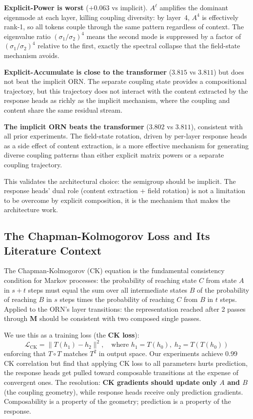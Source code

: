\documentclass[11pt, a4paper]{article}
\newcommand{\M}{\mathbf{M}}
\theoremstyle{plain}
\theoremstyle{remark}
\begin{document}
\textbf{Explicit-Power is worst} ($+0.063$ vs implicit).
$A^\ell$ amplifies the dominant eigenmode at each layer, killing coupling diversity: by layer~4, $A^4$ is effectively rank-1, so all tokens couple through the same pattern regardless of context.
The eigenvalue ratio $(\sigma_1/\sigma_2)^4$ means the second mode is suppressed by a factor of $(\sigma_1/\sigma_2)^4$ relative to the first, exactly the spectral collapse that the field-state mechanism avoids.

\textbf{Explicit-Accumulate is close to the transformer} ($3.815$ vs $3.811$) but does not beat the implicit ORN.
The separate coupling state provides a compositional trajectory, but this trajectory does not interact with the content extracted by the response heads as richly as the implicit mechanism, where the coupling and content share the same residual stream.

\textbf{The implicit ORN beats the transformer} ($3.802$ vs $3.811$), consistent with all prior experiments.
The field-state rotation, driven by per-layer response heads as a side effect of content extraction, is a more effective mechanism for generating diverse coupling patterns than either explicit matrix powers or a separate coupling trajectory.

This validates the architectural choice: the semigroup should be implicit.
The response heads' dual role (content extraction + field rotation) is not a limitation to be overcome by explicit composition, it is the mechanism that makes the architecture work.

\subsection{The Chapman-Kolmogorov Loss and Its Literature Context}

The Chapman-Kolmogorov (CK) equation is the fundamental consistency condition for Markov processes: the probability of reaching state $C$ from state $A$ in $s{+}t$ steps must equal the sum over all intermediate states $B$ of the probability of reaching $B$ in $s$ steps times the probability of reaching $C$ from $B$ in $t$ steps.
Applied to the ORN's layer transitions: the representation reached after 2 passes through $\M$ should be consistent with two composed single passes.

We use this as a training loss (the \textbf{CK loss}):
\[
\mathcal{L}_{\text{CK}} = \| T(h_1) - h_2 \|^2, \quad \text{where } h_1 = T(h_0), \; h_2 = T(T(h_0))
\]
enforcing that $T \circ T$ matches $T^2$ in output space.
Our experiments achieve 0.99 CK correlation but find that applying CK loss to all parameters hurts prediction, the response heads get pulled toward composable transitions at the expense of convergent ones.
The resolution: \textbf{CK gradients should update only $A$ and $B$} (the coupling geometry), while response heads receive only prediction gradients.
Composability is a property of the geometry; prediction is a property of the response.
\end{document}
